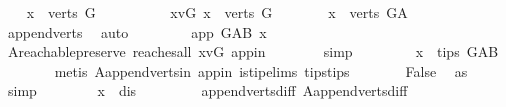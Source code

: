 \begin{isabellebody}
\ \ \isamarkupfalse%
\ {\isachardoublequoteopen}x\ {\isasymnotin}\ verts\ G{\isachardoublequoteclose}\isanewline
\ \ \isamarkupfalse%
\ \isanewline
\ \ \ \ \isamarkupfalse%
\ x{\isacharunderscore}{\kern0pt}vG{\isacharcolon}{\kern0pt}\ {\isachardoublequoteopen}x\ {\isasymin}\ verts\ G{\isachardoublequoteclose}\isanewline
\ \ \ \ \isamarkupfalse%
\ \isamarkupfalse%
\ {\isachardoublequoteopen}x\ {\isasymin}\ verts\ G{\isacharunderscore}{\kern0pt}A{\isachardoublequoteclose}\ \isamarkupfalse%
\ append{\isacharunderscore}{\kern0pt}verts\ \isamarkupfalse%
\ auto\ \isanewline
\ \ \ \ \isamarkupfalse%
\ \isamarkupfalse%
\ {\isachardoublequoteopen}app\ {\isasymrightarrow}\isactrlsup {\isacharplus}{\kern0pt}\isactrlbsub G{\isacharunderscore}{\kern0pt}AB\isactrlesub \ x{\isachardoublequoteclose}\ \isamarkupfalse%
\ A{}{\isachardot}{\kern0pt}reachable{}{\isacharunderscore}{\kern0pt}preserve\ reaches{\isacharunderscore}{\kern0pt}all\ x{\isacharunderscore}{\kern0pt}vG\ app{\isacharunderscore}{\kern0pt}in\isanewline
\ \ \ \ \ \ \isamarkupfalse%
\ simp\ \isanewline
\ \ \ \ \isamarkupfalse%
\ \isamarkupfalse%
\ {\isachardoublequoteopen}x\ {\isasymnotin}\ tips\ G{\isacharunderscore}{\kern0pt}AB{\isachardoublequoteclose}\isanewline
\ \ \ \ \ \ \isamarkupfalse%
\ {\isacharparenleft}{\kern0pt}metis\ A{}{\isachardot}{\kern0pt}append{\isacharunderscore}{\kern0pt}verts{\isacharunderscore}{\kern0pt}in\ app{\isacharunderscore}{\kern0pt}in\ is{\isacharunderscore}{\kern0pt}tip{\isachardot}{\kern0pt}elims{\isacharparenleft}{\kern0pt}{}{\isacharparenright}{\kern0pt}\ tips{\isacharunderscore}{\kern0pt}tips{\isacharparenright}{\kern0pt}\isanewline
\ \ \ \ \isamarkupfalse%
\ \isamarkupfalse%
\ False\ \isamarkupfalse%
\ as{}\ \isamarkupfalse%
\ simp\isanewline
\ \ \isamarkupfalse%
\isanewline
\ \ \isamarkupfalse%
\ \isamarkupfalse%
\ {\isachardoublequoteopen}x\ {\isacharequal}{\kern0pt}\ dis{\isachardoublequoteclose}\ \isamarkupfalse%
\ \isanewline
\ \ \ \ \ \ append{\isacharunderscore}{\kern0pt}verts{\isacharunderscore}{\kern0pt}diff\ A{}{\isachardot}{\kern0pt}append{\isacharunderscore}{\kern0pt}verts{\isacharunderscore}{\kern0pt}diff\ \isamarkupfalse%

\end{isabellebody}

